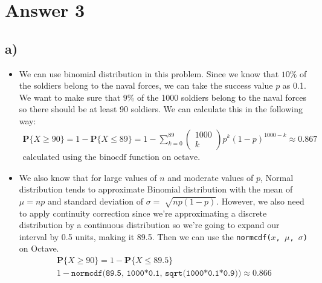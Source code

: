 \documentclass[12pt]{article}
\begin{document}
\section*{Answer 3}
\subsection*{a)}
\begin{itemize}
    \item We can use binomial distribution in this problem. Since we know that $10\%$ of the soldiers belong to the naval forces, we can take the success value $p$ as 0.1. We want to make sure that $9\%$ of the 1000 soldiers belong to the naval forces so there should be at least 90 soldiers. We can calculate this in the following way:
    \begin{equation*}
        \begin{split}
            \textbf{P}\{X \geq 90\} = 1 - \textbf{P}\{X \leq 89\} = 1 - \sum_{k = 0}^{89} \begin{pmatrix} 1000 \\ k \end{pmatrix} p^k(1-p)^{1000-k} \approx 0.867\\
            \text{calculated using the binocdf function on octave.}
        \end{split}
     \end{equation*}
     \item We also know that for large values of $n$ and moderate values of $p$, Normal distribution tends to approximate Binomial distribution with the mean of $\mu = np$ and standard deviation of $\sigma = \sqrt[]{np(1-p)}$. However, we also need to apply continuity correction since we're approximating a discrete distribution by a continuous distribution so we're going to expand our interval by 0.5 units, making it 89.5. Then we can use the \texttt{normcdf($x$, $\mu$, $\sigma$)} on Octave.
     \begin{equation*}
        \begin{split}
            \textbf{P}\{X \geq 90\} = 1 - \textbf{P}\{X \leq 89.5\}\\ 1 - \texttt{normcdf(89.5, 1000*0.1, sqrt(1000*0.1*0.9))} \approx 0.866\\
        \end{split}
     \end{equation*}
\end{itemize} 
\end{document}
